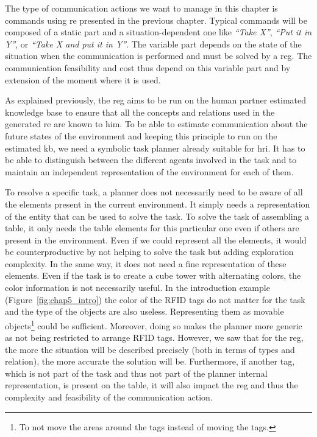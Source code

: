 The type of communication actions we want to manage in this chapter is commands using \acrlong{re} presented in the previous chapter. Typical commands will be composed of a static part and a situation-dependent one like \textit{``Take X''}, \textit{``Put it in Y''}, or \textit{``Take X and put it in Y''}. The variable part depends on the state of the situation when the communication is performed and must be solved by a \acrshort{reg}. The communication feasibility and cost thus depend on this variable part and by extension of the moment where it is used.

As explained previously, the \acrshort{reg} aims to be run on the human partner estimated knowledge base to ensure that all the concepts and relations used in the generated \acrshort{re} are known to him. To be able to estimate communication about the future states of the environment and keeping this principle to run on the estimated \acrshort{kb}, we need a symbolic task planner already suitable for \acrshort{hri}. It has to be able to distinguish between the different agents involved in the task and to maintain an independent representation of the environment for each of them.

To resolve a specific task, a planner does not necessarily need to be aware of all the elements present in the current environment. It simply needs a representation of the entity that can be used to solve the task. To solve the task of assembling a table, it only needs the table elements for this particular one even if others are present in the environment. Even if we could represent all the elements, it would be counterproductive by not helping to solve the task but adding exploration complexity.
In the same way, it does not need a fine representation of these elements. Even if the task is to create a cube tower with alternating colors, the color information is not necessarily useful. In the introduction example (Figure~\ref{fig:chap5_intro}) the color of the RFID tags do not matter for the task and the type of the objects are also useless. Representing them as movable objects\footnote{To not move the areas around the tags instead of moving the tags.} could be sufficient. Moreover, doing so makes the planner more generic as not being restricted to arrange RFID tags. However, we saw that for the \acrshort{reg}, the more the situation will be described precisely (both in terms of types and relation), the more accurate the solution will be. Furthermore, if another tag, which is not part of the task and thus not part of the planner internal representation, is present on the table, it will also impact the \acrshort{reg} and thus the complexity and feasibility of the communication action. 

